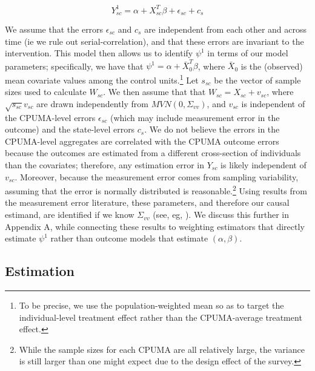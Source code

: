\documentclass[12pt]{article}
\begin{document}
$$
Y_{sc}^1 = \alpha + X_{sc}^T\beta + \epsilon_{sc} + c_s
$$

We assume that the errors $\epsilon_{sc}$ and $c_s$ are independent from each other and across time (ie we rule out serial-correlation), and that these errors are invariant to the intervention. This model then allows us to identify $\psi^1$ in terms of our model parameters; specifically, we have that $\psi^1 = \alpha + \bar{X}_0^T\beta$, where $\bar{X}_0$ is the (observed) mean covariate values among the control units.\footnote{To be precise, we use the population-weighted mean so as to target the individual-level treatment effect rather than the CPUMA-average treatment effect.} Let $s_{sc}$ be the vector of sample sizes used to calculate $W_{sc}$. We then assume that that $W_{sc} = X_{sc} + v_{sc}$, where $\sqrt{s_{sc}}v_{sc}$ are drawn independently from $MVN(0, \Sigma_{vv})$, and $v_{sc}$ is independent of the CPUMA-level errors $\epsilon_{sc}$ (which may include measurement error in the outcome) and the state-level errors $c_s$. We do not believe the errors in the CPUMA-level aggregates are correlated with the CPUMA outcome errors because the outcomes are estimated from a different cross-section of individuals than the covariates; therefore, any estimation error in $Y_{sc}$ is likely independent of $v_{sc}$. Moreover, because the measurement error comes from sampling variability, assuming that the error is normally distributed is reasonable.\footnote{While the sample sizes for each CPUMA are all relatively large, the variance is still larger than one might expect due to the design effect of the survey.} Using results from the measurement error literature, these parameters, and therefore our causal estimand, are identified if we know $\Sigma_{vv}$ (see, eg, \cite{gleser1992importance}). We discuss this further in Appendix A, while connecting these results to weighting estimators that directly estimate $\psi^1$ rather than outcome models that estimate $(\alpha, \beta)$. 

\subsection{Estimation}
\end{document}
